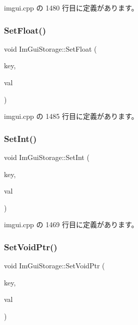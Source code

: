  imgui.\+cpp の 1480 行目に定義があります。

\mbox{\label{struct_im_gui_storage_ab531d90a0e5a1a2453e351c499149756}} 
\subsubsection{\texorpdfstring{Set\+Float()}{SetFloat()}}
{\footnotesize\ttfamily void Im\+Gui\+Storage\+::\+Set\+Float (\begin{DoxyParamCaption}\item[{\mbox{\hyperlink{imgui_8h_a1785c9b6f4e16406764a85f32582236f}{Im\+Gui\+ID}}}]{key,  }\item[{float}]{val }\end{DoxyParamCaption})}



 imgui.\+cpp の 1485 行目に定義があります。

\mbox{\label{struct_im_gui_storage_af83975ca841a9bd0e06a6ea0a41bf159}} 
\subsubsection{\texorpdfstring{Set\+Int()}{SetInt()}}
{\footnotesize\ttfamily void Im\+Gui\+Storage\+::\+Set\+Int (\begin{DoxyParamCaption}\item[{\mbox{\hyperlink{imgui_8h_a1785c9b6f4e16406764a85f32582236f}{Im\+Gui\+ID}}}]{key,  }\item[{int}]{val }\end{DoxyParamCaption})}



 imgui.\+cpp の 1469 行目に定義があります。

\mbox{\label{struct_im_gui_storage_a55f840086b3ec9cf63c67f02d159204a}} 
\subsubsection{\texorpdfstring{Set\+Void\+Ptr()}{SetVoidPtr()}}
{\footnotesize\ttfamily void Im\+Gui\+Storage\+::\+Set\+Void\+Ptr (\begin{DoxyParamCaption}\item[{\mbox{\hyperlink{imgui_8h_a1785c9b6f4e16406764a85f32582236f}{Im\+Gui\+ID}}}]{key,  }\item[{void $\ast$}]{val }\end{DoxyParamCaption})}



